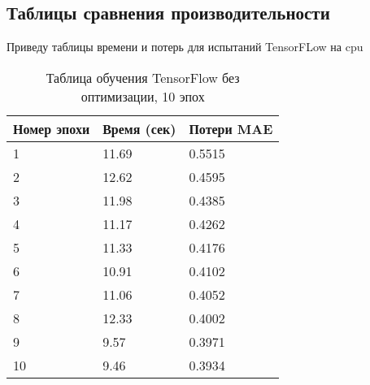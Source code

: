 \documentclass[a4paper,12pt,titlepage,final]{article}
\begin{document}
\begin{center}
    \item \subsection{Таблицы сравнения производительности}
\end{center}

Приведу таблицы времени и потерь для испытаний TensorFLow на cpu

\begin{table}[H]
\centering
\begin{tabular}{|p{5.4cm}|p{3.8cm}|p{3.8cm}|}
\hline
Номер эпохи & Время (сек) & Потери MAE\\
\hline
1 & 11.69 & 0.5515 \\ [1.5ex]
\hline
2 & 12.62 & 0.4595 \\ [1.5ex]
\hline
3 & 11.98 & 0.4385 \\ [1.5ex]
\hline
4 & 11.17 & 0.4262 \\ [1.5ex]
\hline
5 & 11.33 & 0.4176 \\ [1.5ex]
\hline
6 & 10.91 & 0.4102 \\ [1.5ex]
\hline
7 & 11.06 & 0.4052 \\ [1.5ex]
\hline
8 & 12.33 & 0.4002 \\ [1.5ex]
\hline
9 & 9.57 & 0.3971 \\ [1.5ex]
\hline
10 & 9.46 & 0.3934 \\ [1.5ex]
\hline
\end{tabular}
\caption{Таблица обучения TensorFlow без оптимизации, 10 эпох}
\label{table1}
\end{table}
\end{document}
